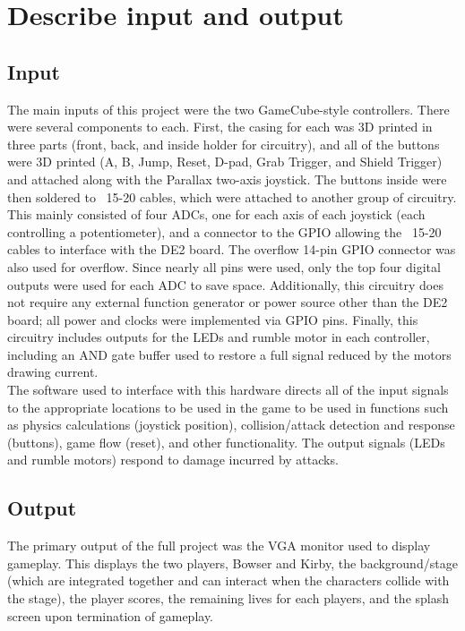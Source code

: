 \documentclass[12pt]{article} %
\begin{document}
\section{Describe input and output}
\subsection{Input}
The main inputs of this project were the two GameCube-style controllers. There were several components to each. First, the casing for each was 3D printed in three parts (front, back, and inside holder for circuitry), and all of the buttons were 3D printed (A, B, Jump, Reset, D-pad, Grab Trigger, and Shield Trigger) and attached along with the Parallax two-axis joystick. The buttons inside were then soldered to ~15-20 cables, which were attached to another group of circuitry. This mainly consisted of four ADCs, one for each axis of each joystick (each controlling a potentiometer), and a connector to the GPIO allowing the ~15-20 cables to interface with the DE2 board. The overflow 14-pin GPIO connector was also used for overflow. Since nearly all pins were used, only the top four digital outputs were used for each ADC to save space. Additionally, this circuitry does not require any external function generator or power source other than the DE2 board; all power and clocks were implemented via GPIO pins. Finally, this circuitry includes outputs for the LEDs and rumble motor in each controller, including an AND gate buffer used to restore a full signal reduced by the motors drawing current.\\

The software used to interface with this hardware directs all of the input signals to the appropriate locations to be used in the game to be used in functions such as physics calculations (joystick position), collision/attack detection and response (buttons), game flow (reset), and other functionality. The output signals (LEDs and rumble motors) respond to damage incurred by attacks.

\subsection{Output}
The primary output of the full project was the VGA monitor used to display gameplay. This displays the two players, Bowser and Kirby, the background/stage (which are integrated together and can interact when the characters collide with the stage), the player scores, the remaining lives for each players, and the splash screen upon termination of gameplay.\\
\end{document}
